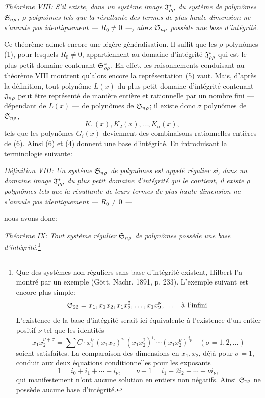 \emph{Théorème VIII: S'il existe, dans un système image $\mathfrak{J}^*_{\rho\rho}$ du système de polynômes $\mathfrak{S}_{n\rho}$, $\rho$ polynômes tels que la résultante des termes de plus haute dimension ne s'annule pas identiquement --- $R_0\ne0$ ---, alors $\mathfrak{S}_{n\rho}$ possède une base d'intégrité.}

Ce théorème admet encore une légère généralisation. Il suffit que les $\rho$ polynômes (1), pour lesquels $R_0\ne0$, appartiennent au domaine d’intégrité $\mathfrak{J}^*_{\rho\rho}$ qui est le plus petit domaine contenant $\mathfrak{S}^*_{\rho\rho}$. En effet, les raisonnements conduisant au théorème VIII montrent qu'alors encore la représentation (5) vaut. Mais, d'après la définition, tout polynôme $L(x)$ du plus petit domaine d’intégrité contenant $\mathfrak{J}_{n\rho}$ peut être représenté de manière entière et rationnelle par un nombre fini --- dépendant de $L(x)$ --- de polynômes de $\mathfrak{S}_{n\rho}$; il existe donc $\sigma$ polynômes de $\mathfrak{S}_{n\rho}$,
\begin{equation}
  K_1(x),K_2(x),\ldots,K_\sigma(x),
\tag{6}
\end{equation}
tels que les polynômes $G_i(x)$ deviennent des combinaisons rationnelles entières de (6). Ainsi (6) et (4) donnent une base d'intégrité. En introduisant la terminologie suivante:

\emph{Définition VIII: Un système $\mathfrak{S}_{n\rho}$ de polynômes est appelé régulier si, dans un domaine image $\mathfrak{J}^*_{\rho\rho}$ du plus petit domaine d’intégrité qui le contient, il existe $\rho$ polynômes tels que la résultante de leurs termes de plus haute dimension ne s'annule pas identiquement --- $R_0\ne0$ ---}

nous avons donc:

\emph{Théorème IX: Tout système régulier $\mathfrak{S}_{n\rho}$ de polynômes possède une base d'intégrité.}\footnote{Que des systèmes non réguliers sans base d'intégrité existent, Hilbert l'a montré par un exemple (Gött. Nachr. 1891, p. 233). L'exemple suivant est encore plus simple:
\[
  \mathfrak{S}_{22}=x_1,
  x_1x_2,
  x_1x_2^2,
  \ldots,
  x_1x_2^\nu,
  \ldots\quad\text{à l'infini.}
\]
L'existence de la base d'intégrité serait ici équivalente à l'existence d'un entier positif $\nu$ tel que les identités
\[
  x_1x_2^{\nu+\sigma}=\sum C\cdot x_1^{i_0}(x_1x_2)^{i_1}(x_1x_2^2)^{i_2}\cdots(x_1x_2^\nu)^{i_\nu}
  \quad(\sigma=1,2,\ldots)
\]
soient satisfaites. La comparaison des dimensions en $x_1,x_2$, déjà pour $\sigma=1$, conduit aux deux équations conditionnelles pour les exposants
\[
  1=i_0+i_1+\cdots+i_\nu,
  \qquad
  \nu+1=i_1+2i_2+\cdots+\nu i_\nu,
\]
qui manifestement n'ont aucune solution en entiers non négatifs. Ainsi $\mathfrak{S}_{22}$ ne possède aucune base d'intégrité.}

